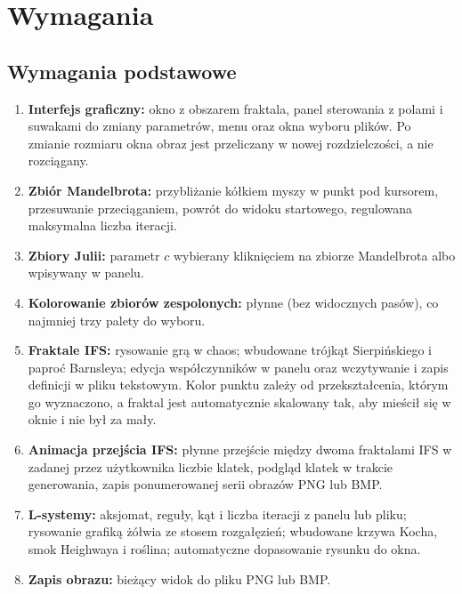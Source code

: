 \documentclass[11pt,a4paper]{article}
\begin{document}
\section{Wymagania}

\subsection{Wymagania podstawowe}

\begin{enumerate}
  \item \textbf{Interfejs graficzny:} okno z obszarem fraktala, panel
        sterowania z polami i suwakami do zmiany parametrów, menu oraz okna
        wyboru plików. Po zmianie rozmiaru okna obraz jest przeliczany w nowej
        rozdzielczości, a nie rozciągany.
  \item \textbf{Zbiór Mandelbrota:} przybliżanie kółkiem myszy w punkt pod
        kursorem, przesuwanie przeciąganiem, powrót do widoku startowego,
        regulowana maksymalna liczba iteracji.
  \item \textbf{Zbiory Julii:} parametr $c$ wybierany kliknięciem na zbiorze
        Mandelbrota albo wpisywany w panelu.
  \item \textbf{Kolorowanie zbiorów zespolonych:} płynne (bez widocznych pasów),
        co najmniej trzy palety do wyboru.
  \item \textbf{Fraktale IFS:} rysowanie grą w chaos; wbudowane trójkąt
        Sierpińskiego i paproć Barnsleya; edycja współczynników w panelu oraz
        wczytywanie i zapis definicji w pliku tekstowym. Kolor punktu zależy
        od przekształcenia, którym go wyznaczono, a fraktal jest automatycznie
        skalowany tak, aby mieścił się w oknie i nie był za mały.
  \item \textbf{Animacja przejścia IFS:} płynne przejście między dwoma
        fraktalami IFS w zadanej przez użytkownika liczbie klatek, podgląd
        klatek w trakcie generowania, zapis ponumerowanej serii obrazów PNG
        lub BMP.
  \item \textbf{L-systemy:} aksjomat, reguły, kąt i liczba iteracji z panelu
        lub pliku; rysowanie grafiką żółwia ze stosem rozgałęzień; wbudowane
        krzywa Kocha, smok Heighwaya i roślina; automatyczne dopasowanie
        rysunku do okna.
  \item \textbf{Zapis obrazu:} bieżący widok do pliku PNG lub BMP.
\end{enumerate}
\end{document}
